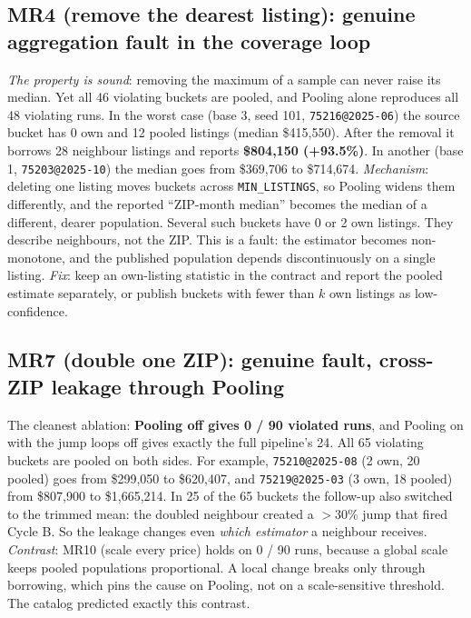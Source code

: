\documentclass[11pt,a4paper]{article}
\begin{document}
\subsection*{MR4 (remove the dearest listing): genuine aggregation fault in the coverage loop}
\emph{The property is sound}: removing the maximum of a sample can never raise its median. Yet all 46 violating buckets
are pooled, and Pooling alone reproduces all 48 violating runs. In the worst case (base 3, seed 101,
\texttt{75216@2025-06}) the source bucket has 0 own and 12 pooled listings (median \$415,550). After the removal it
borrows 28 neighbour listings and reports \textbf{\$804,150 (+93.5\%)}. In another (base 1, \texttt{75203@2025-10}) the
median goes from \$369,706 to \$714,674. \emph{Mechanism}: deleting one listing moves buckets across
\texttt{MIN\_LISTINGS}, so Pooling widens them differently, and the reported ``ZIP-month median'' becomes the
median of a different, dearer population. Several such buckets have 0 or 2 own listings. They describe neighbours,
not the ZIP. This is a fault: the estimator becomes non-monotone, and the published population depends
discontinuously on a single listing. \emph{Fix}: keep an own-listing statistic in the contract and report the pooled
estimate separately, or publish buckets with fewer than $k$ own listings as low-confidence.

\subsection*{MR7 (double one ZIP): genuine fault, cross-ZIP leakage through Pooling}
The cleanest ablation: \textbf{Pooling off gives 0 / 90 violated runs}, and Pooling on with the jump loops off gives
exactly the full pipeline's 24. All 65 violating buckets are pooled on both sides. For example, \texttt{75210@2025-08}
(2 own, 20 pooled) goes from \$299,050 to \$620,407, and \texttt{75219@2025-03} (3 own, 18 pooled) from \$807,900 to
\$1,665,214. In 25 of the 65 buckets the follow-up also switched to the trimmed mean: the doubled neighbour created a
$>30\%$ jump that fired Cycle B. So the leakage changes even \emph{which estimator} a neighbour receives.
\emph{Contrast}: MR10 (scale every price) holds on 0 / 90 runs, because a global scale keeps pooled populations
proportional. A local change breaks only through borrowing, which pins the cause on Pooling, not on a scale-sensitive
threshold. The catalog predicted exactly this contrast.
\end{document}
